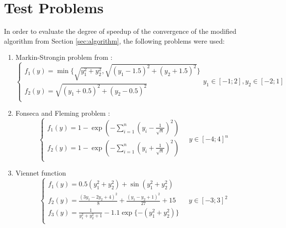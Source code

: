 \documentclass{llncs}
\begin{document}
\section{Test Problems}
\label{sec:test_problems}
In order to evaluate the degree of speedup of the convergence of the modified algorithm from
Section \ref{sec:algorithm}, the following problems were used:
\begin{enumerate}
  \item Markin-Strongin problem from \cite{markinStrongin1993}:
    \begin{equation}
      \left \{
      \begin{array}{l}
        f_1(y) = \min\{\sqrt{y_1^2+y_2^2},\sqrt{(y_1-1.5)^2+(y_2+1.5)^2}\} \\
        f_2(y)=\sqrt{(y_1+0.5)^2+(y_2-0.5)^2} \\
      \end{array}
      \right .
      y_1\in [-1;2],y_2\in [-2;1]
    \end{equation}
  \item Fonseca and Fleming problem \cite{Huband2006}:
  \begin{equation}
    \label{eq:fonseca}
    \left \{
    \begin{array}{l}
      f_{1}\left(y\right) = 1 - \exp \left(-\sum_{i=1}^{n} \left(y_{i} - \frac{1}{\sqrt{n}}
\right)^{2} \right) \\
      f_{2}\left(y\right) = 1 - \exp \left(-\sum_{i=1}^{n} \left(y_{i} + \frac{1}{\sqrt{n}}
\right)^{2} \right) \\
    \end{array}
    \right .
    \quad y\in [-4;4]^n
  \end{equation}
  \item
  Viennet function
  \begin{equation}
    \left \{
    \begin{array}{l}
      f_{1}\left(y\right) = 0.5(y_1^2 + y_2^2) + \sin(y_1^2 + y_2^2)\\
      f_{2}\left(y\right) = \frac{(3y_1 - 2y_2 + 4)^2}{8} + \frac{(y_1-y_2 + 1)^2}{27} + 15\\
      f_{3}\left(y\right) = \frac{1}{y_1^2+y_2^2 + 1} -1.1 \exp\{-(y_1^2+y_2^2)\}\\
    \end{array}
    \right .
    \quad y\in [-3;3]^2
  \end{equation}

\end{enumerate}
\end{document}
